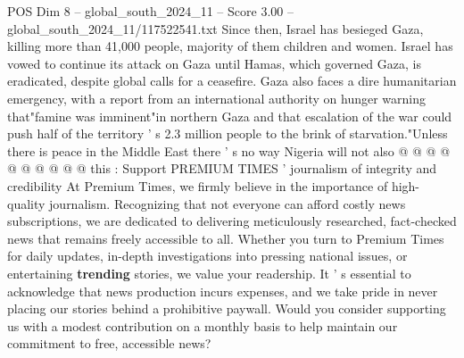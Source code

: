 \begin{textsample}{POS Dim 8 – global\_south\_2024\_11 – Score 3.00 – global\_south\_2024\_11/117522541.txt}
Since then, Israel has besieged Gaza, killing more than 41,000 people, majority of them children and women.
Israel has vowed to continue its attack on Gaza until Hamas, which governed Gaza, is eradicated, despite global calls for a ceasefire.
Gaza also faces a dire humanitarian emergency, with a report from an international authority on hunger warning that"famine was imminent"in northern Gaza and that escalation of the war could push half of the territory ' s 2.3 million people to the brink of starvation."Unless there is peace in the Middle East there ' s no way Nigeria will not also @ @ @ @ @ @ @ @ @ @ this : Support PREMIUM TIMES ' journalism of integrity and credibility At Premium Times, we firmly believe in the importance of high-quality journalism.
Recognizing that not everyone can afford costly news subscriptions, we are dedicated to delivering meticulously researched, fact-checked news that remains freely accessible to all.
Whether you turn to Premium Times for daily updates, in-depth investigations into pressing national issues, or entertaining \textbf{trending} stories, we value your readership.
It ' s essential to acknowledge that news production incurs expenses, and we take pride in never placing our stories behind a prohibitive paywall.
Would you consider supporting us with a modest contribution on a monthly basis to help maintain our commitment to free, accessible news?

\end{textsample}
